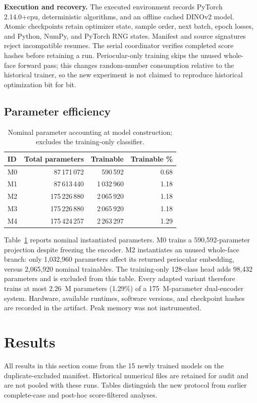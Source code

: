 \documentclass[10pt,journal,compsoc]{IEEEtran}
\begin{document}
\textbf{Execution and recovery.} The executed environment records PyTorch 2.14.0+cpu, deterministic algorithms, and an offline cached DINOv2 model. Atomic checkpoints retain optimizer state, sample order, next batch, epoch losses, and Python, NumPy, and PyTorch RNG states. Manifest and source signatures reject incompatible resumes. The serial coordinator verifies completed score hashes before retaining a run. Periocular-only training skips the unused whole-face forward pass; this changes random-number consumption relative to the historical trainer, so the new experiment is not claimed to reproduce historical optimization bit for bit.

\subsection{Parameter efficiency}

\begin{table}[h]
\centering
\caption{Nominal parameter accounting at model construction; excludes the training-only classifier.}
\label{tab:params}
\begin{tabular}{lrrr}
\toprule
ID & Total parameters & Trainable & Trainable \%\\
\midrule
M0 & 87\,171\,072 & 590\,592 & 0.68\\
M1 & 87\,613\,440 & 1\,032\,960 & 1.18\\
M2 & 175\,226\,880 & 2\,065\,920 & 1.18\\
M3 & 175\,226\,880 & 2\,065\,920 & 1.18\\
M4 & 175\,424\,257 & 2\,263\,297 & 1.29\\
\bottomrule
\end{tabular}
\end{table}

Table~\ref{tab:params} reports nominal instantiated parameters. M0 trains a 590,592-parameter projection despite freezing the encoder. M2 instantiates an unused whole-face branch: only 1,032,960 parameters affect its returned periocular embedding, versus 2,065,920 nominal trainables. The training-only 128-class head adds 98,432 parameters and is excluded from this table. Every adapted variant therefore trains at most 2.26~M parameters (1.29\%) of a 175~M-parameter dual-encoder system. Hardware, available runtimes, software versions, and checkpoint hashes are recorded in the artifact. Peak memory was not instrumented.


\section{Results}
All results in this section come from the 15 newly trained models on the duplicate-excluded manifest. Historical numerical files are retained for audit and are not pooled with these runs. Tables distinguish the new protocol from earlier complete-case and post-hoc score-filtered analyses.
\end{document}
